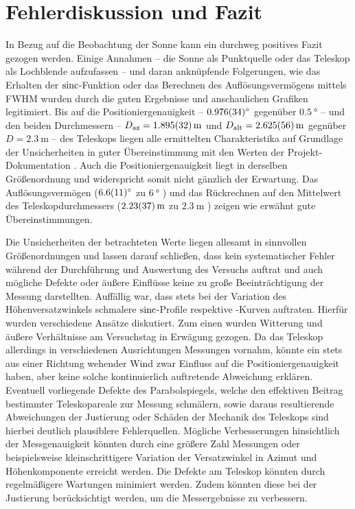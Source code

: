 \section{Fehlerdiskussion und Fazit}
In Bezug auf die Beobachtung der Sonne kann ein durchweg positives Fazit gezogen werden.
Einige Annahmen -- die Sonne als Punktquelle oder das Teleskop als Lochblende aufzufassen -- und daran anknüpfende Folgerungen, wie das Erhalten der $\operatorname{sinc}$-Funktion oder das Berechnen des Auflösungsvermögens mittels FWHM wurden durch die guten Ergebnisse und anschaulichen Grafiken legitimiert.
Bis auf die Positioniergenauigkeit -- $\SI{0.976 \pm 0.034}{\degree}$ gegenüber $\SI{0.5}{\degree}$ \cite{Usermanual} -- und den beiden Durchmessern -- $D_{\text{az}} = \SI{1.895 \pm 0.032}{\metre}$ und $D_{\text{alt}} = \SI{2.625 \pm 0.056}{\metre}$ gegnüber $D = \SI{2.3}{\metre}$ \cite{Usermanual} -- des Teleskops liegen alle ermittelten Charakteristika auf Grundlage der Unsicherheiten in guter Übereinstimmung mit den Werten der Projekt-Dokumentation \cite{Usermanual}.
Auch die Positioniergenauigkeit liegt in derselben Größenordnung und widerspricht somit nicht gänzlich der Erwartung.
Das Auflösungsvermögen ($\SI{6.6 \pm 1.1}{\degree}$ zu $\SI{6}{\degree}$ \cite{Usermanual}) und das Rückrechnen auf den Mittelwert des Teleskopdurchmessers ($\SI{2.23 \pm 0.37}{\metre}$ zu $\SI{2.3}{\metre}$ \cite{Usermanual}) zeigen wie erwähnt gute Übereinstimmungen.

Die Unsicherheiten der betrachteten Werte liegen allesamt in sinnvollen Größenordnungen und lassen darauf schließen, dass kein systematischer Fehler während der Durchführung und Auswertung des Versuchs auftrat und auch mögliche Defekte oder äußere Einflüsse keine zu große Beeinträchtigung der Messung darstellten.
Auffällig war, dass stets bei der Variation des Höhenversatzwinkels schmalere $\operatorname{sinc}$-Profile respektive -Kurven auftraten.
Hierfür wurden verschiedene Ansätze diskutiert.
Zum einen wurden Witterung und äußere Verhältnisse am Versuchstag in Erwägung gezogen.
Da das Teleskop allerdings in verschiedenen Ausrichtungen Messungen vornahm, könnte ein stets aus einer Richtung wehender Wind zwar Einfluss auf die Positioniergenauigkeit haben, aber keine solche kontinuierlich auftretende Abweichung erklären.
Eventuell vorliegende Defekte des Parabolspiegels, welche den effektiven Beitrag bestimmter Teleskopareale zur Messung schmälern, sowie daraus resultierende Abweichungen der Justierung oder Schäden der Mechanik des Teleskops sind hierbei deutlich plausiblere Fehlerquellen.
Mögliche Verbesserungen hinsichtlich der Messgenauigkeit könnten durch eine größere Zahl Messungen oder beispielsweise kleinschrittigere Variation der Versatzwinkel in Azimut und Höhenkomponente erreicht werden.
Die Defekte am Teleskop könnten durch regelmäßigere Wartungen minimiert werden.
Zudem könnten diese bei der Justierung berücksichtigt werden, um die Messergebnisse zu verbessern. \newpage

